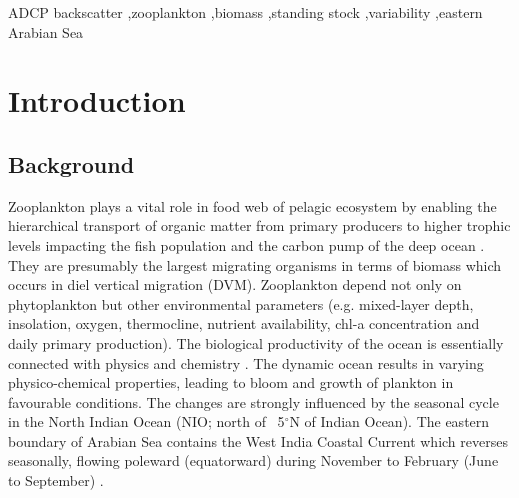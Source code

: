 \documentclass[authoryear,review,12pt]{elsarticle}
\begin{document}
\begin{frontmatter}
\begin{abstract}
	\end{abstract}

	\begin{keyword}
	ADCP backscatter \sep zooplankton \sep biomass \sep standing stock \sep variability \sep eastern Arabian Sea
	\end{keyword}
	\end{frontmatter}
	
\pagebreak


\linenumbers
	\section{Introduction}
	\subsection{Background}
	Zooplankton plays a vital role in food web of pelagic ecosystem by enabling the hierarchical transport of organic matter from primary producers to higher trophic levels impacting the fish population \citep{ohman2001density} and the carbon pump of the deep ocean \citep{le2016global}. They are presumably the largest migrating organisms in terms of biomass \citep{hays2003review} which occurs in diel vertical migration (DVM). Zooplankton depend not only on phytoplankton but other environmental parameters (e.g. mixed-layer depth, insolation, oxygen, thermocline, nutrient availability, chl-a concentration and daily primary production). The biological productivity of the ocean is essentially connected with physics and chemistry \citep{subrahmanyan1959studiespart2, ryther1966primary, nair1970primary, qasim1977biological,banse1995zooplankton,mccreary2009biophysical, vijith2016consequences,amol2020modulation}. The dynamic ocean results in varying physico-chemical properties, leading to bloom and growth of plankton in favourable conditions. The changes are strongly influenced by the seasonal cycle in the North Indian Ocean (NIO; north of ~5$^{\circ}$N of Indian Ocean). The eastern boundary of Arabian Sea contains the West India Coastal Current \citep[WICC;][]{ramamirtham1965hydrography, banse1968hydrography, shetye1990hydrography,mccreary1993numerical, amol2014observed, vijith2016consequences, chaudhuri2020observed} which reverses seasonally, flowing poleward (equatorward) during November to February (June to September) \citep{shetye1990hydrography,shetye19911517,vijith2022circulation}. 
	
\end{document}
